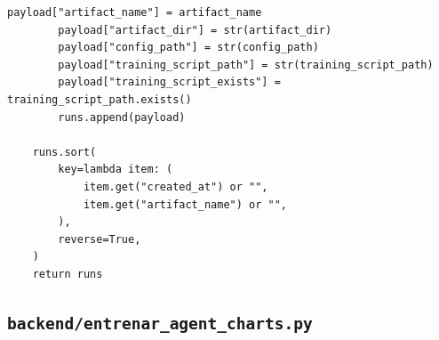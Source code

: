 \documentclass[10pt,a4paper]{article}
\begin{document}
\begin{lstlisting}[style=studioPython,caption={backend/entrenar\_agent\_artifacts.py},label={lst:backend-entrenar-agent-artifacts-py}]
        payload["artifact_name"] = artifact_name
        payload["artifact_dir"] = str(artifact_dir)
        payload["config_path"] = str(config_path)
        payload["training_script_path"] = str(training_script_path)
        payload["training_script_exists"] = training_script_path.exists()
        runs.append(payload)

    runs.sort(
        key=lambda item: (
            item.get("created_at") or "",
            item.get("artifact_name") or "",
        ),
        reverse=True,
    )
    return runs
\end{lstlisting}


\subsection{\texorpdfstring{\texttt{backend/entrenar\_agent\_charts.py}}{backend/entrenar\_agent\_charts.py}}
\end{document}
